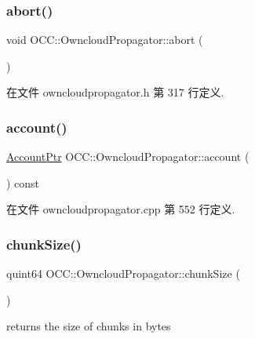 \subsubsection{\texorpdfstring{abort()}{abort()}}
{\footnotesize\ttfamily void O\+C\+C\+::\+Owncloud\+Propagator\+::abort (\begin{DoxyParamCaption}{ }\end{DoxyParamCaption})}



在文件 owncloudpropagator.\+h 第 317 行定义.

\mbox{\label{class_o_c_c_1_1_owncloud_propagator_a1bb27ec3d83c2030eba874f0e07cb2d2}} 
\subsubsection{\texorpdfstring{account()}{account()}}
{\footnotesize\ttfamily \hyperlink{namespace_o_c_c_a848616aedb9188e223c6b9867757fe69}{Account\+Ptr} O\+C\+C\+::\+Owncloud\+Propagator\+::account (\begin{DoxyParamCaption}{ }\end{DoxyParamCaption}) const}



在文件 owncloudpropagator.\+cpp 第 552 行定义.

\mbox{\label{class_o_c_c_1_1_owncloud_propagator_a3932867fca1b6e8c53ec5387c69708a4}} 
\subsubsection{\texorpdfstring{chunk\+Size()}{chunkSize()}}
{\footnotesize\ttfamily quint64 O\+C\+C\+::\+Owncloud\+Propagator\+::chunk\+Size (\begin{DoxyParamCaption}{ }\end{DoxyParamCaption})\hspace{0.3cm}{\ttfamily [static]}}

returns the size of chunks in bytes 

